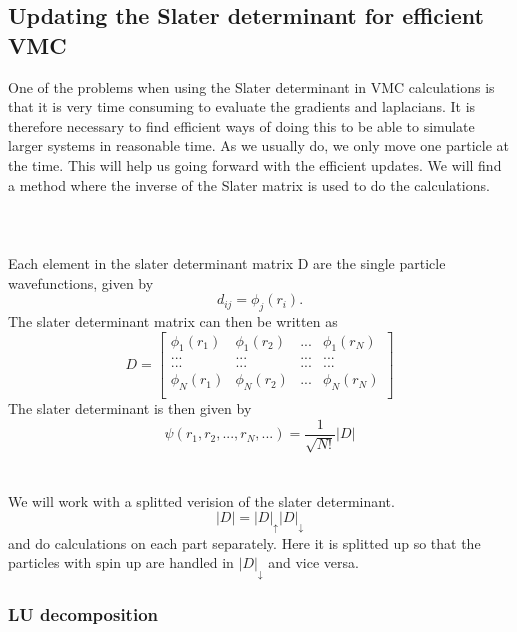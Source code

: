 \subsection{Updating the Slater determinant for efficient VMC}
One of the problems when using the Slater determinant in VMC calculations is that it is very time consuming to evaluate the gradients and laplacians. It is therefore necessary to find efficient ways of doing this to be able to simulate larger systems in reasonable time. As we usually do, we only move one particle at the time. This will help us going forward with the efficient updates. We will find a method where the inverse of the Slater matrix is used to do the calculations. 
\\
\\
 
\\
\\
Each element in the slater determinant matrix D are the single particle wavefunctions, given by
\begin{equation}
    d_{ij} = \phi_j(r_i).
\end{equation}
The slater determinant matrix can then be written as 
\begin{equation}
    D = 
    \begin{bmatrix}
    \phi_1(r_1) & \phi_1(r_2) & ... & \phi_1(r_N) \\
    ... & ... & ... & ... \\
    ... & ... & ... & ... \\
    \phi_N(r_1) & \phi_N(r_2) & ... & \phi_N(r_N) \\ 
    \end{bmatrix}
\end{equation}
The slater determinant is then given by 
\begin{equation}
    \psi(r_1, r_2, ..., r_N, ...) = \frac{1}{\sqrt{N!}}|D|
\end{equation}
\\
\\
We will work with a splitted verision of the slater determinant. 
\begin{equation}
    |D| = |D|_{\uparrow}|D|_{\downarrow}
\end{equation}
and do calculations on each part separately. Here it is splitted up so that the particles with spin up are handled in $|D|_\downarrow$ and vice versa. 

\subsubsection{LU decomposition}

